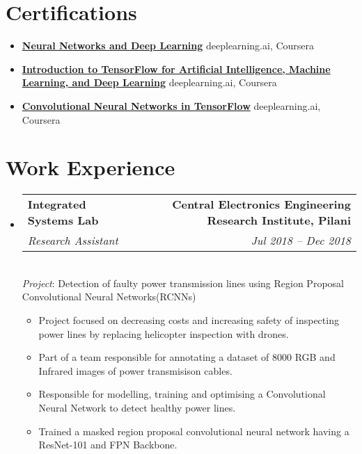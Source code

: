 \documentclass[a4paper]{article}
\makeatletter
\newcommand{\resumeItem}[2]{
	\item\small{
		\textbf{#1}{ #2 \vspace{-5pt}}
	}
}
\newcommand{\resumeSubheading}[4]{
	\vspace{-1pt}\item
	\begin{tabular*}{0.97\textwidth}[t]{l@{\extracolsep{\fill}}r}
		\textbf{\normalsize #1} & {\normalsize #2} \\
		\textit{\small#3} & \textit{\small #4} \\
	\end{tabular*}
	\smallskip \\
}
\newcommand{\resumeSubItem}[2]{\resumeItem{#1}{#2}\vspace{-1pt}}
\newcommand{\resumeSubItemOneArg}[1]{\item \small #1\vspace{-1pt}}
\newcommand{\resumeSubHeadingListStart}{\begin{itemize}[leftmargin=*]}
\newcommand{\resumeSubHeadingListEnd}{\end{itemize}}
\newcommand{\resumeItemListStart}{\begin{itemize} \vspace*{-5pt}}
\newcommand{\resumeItemListEnd}{\end{itemize}}
\makeatother
\begin{document}

\section{Certifications}

\justifying
\resumeSubHeadingListStart

\resumeSubItem{\href{https://www.coursera.org/account/accomplishments/certificate/KJBZ3XKKYAXM}{Neural Networks and Deep Learning}}
{\hfill{deeplearning.ai, Coursera}}
\resumeSubItem{\href{https://www.coursera.org/account/accomplishments/certificate/7G4V3W8T4J7L}{Introduction to TensorFlow for Artificial Intelligence, Machine Learning, and Deep Learning}}
{\hfill{deeplearning.ai, Coursera}}
\resumeSubItem{\href{https://www.coursera.org/account/accomplishments/certificate/HHUQBSMH53JY}{Convolutional Neural Networks in TensorFlow}}
{\hfill{deeplearning.ai, Coursera}}

\resumeSubHeadingListEnd


\section{Work Experience}
\justifying
\resumeSubHeadingListStart
\resumeSubheading
{Integrated Systems Lab}{\textbf{Central Electronics Engineering Research Institute, Pilani}}
{Research Assistant}{Jul 2018 -- Dec 2018}
\emph{Project}: Detection of faulty power transmission lines using Region Proposal Convolutional Neural Networks(RCNNs)
\resumeItemListStart
\resumeSubItemOneArg{Project focused on decreasing costs and increasing safety of inspecting power lines by replacing helicopter inspection with drones.}
\resumeSubItemOneArg{Part of a team responsible for annotating a dataset of 8000 RGB and Infrared images of power transmisison cables.}
\resumeSubItemOneArg{Responsible for modelling, training and optimising a Convolutional Neural Network to detect healthy power lines.}
\resumeSubItemOneArg{Trained a masked region proposal convolutional neural network having a ResNet-101 and FPN Backbone.}
\resumeItemListEnd
\resumeSubHeadingListEnd

\end{document}
